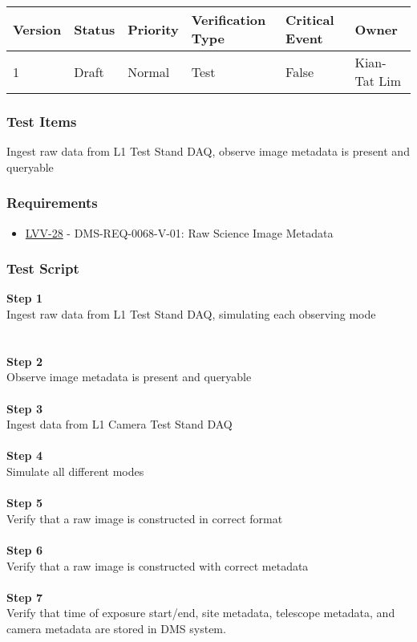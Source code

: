 \begin{longtable}[]{@{}llllll@{}}
\toprule
Version & Status & Priority & Verification Type & Critical Event &
Owner\tabularnewline
\midrule
\endhead
1 & Draft & Normal & Test & False & Kian-Tat Lim\tabularnewline
\bottomrule
\end{longtable}

\hypertarget{test-items-9}{%
\subsubsection{Test Items}\label{test-items-9}}

Ingest raw data from L1 Test Stand DAQ, observe image metadata is
present and queryable

\hypertarget{requirements-10}{%
\subsubsection{Requirements}\label{requirements-10}}

\begin{itemize}
\tightlist
\item
  \href{https://jira.lsstcorp.org/browse/LVV-28}{LVV-28} -
  DMS-REQ-0068-V-01: Raw Science Image Metadata
\end{itemize}

\hypertarget{test-script-10}{%
\subsubsection{Test Script}\label{test-script-10}}

\textbf{Step 1}\\
{Ingest raw data from L1 Test Stand DAQ, simulating each observing
mode\\
}~\\
~\\
\textbf{Step 2}\\
O{bserve image metadata is present and queryable}\\
~\\
\textbf{Step 3}\\
Ingest data from L1 Camera Test Stand DAQ\\
~\\
\textbf{Step 4}\\
Simulate all different modes\\
~\\
\textbf{Step 5}\\
Verify that a raw image is constructed in correct format\\
~\\
\textbf{Step 6}\\
Verify that a raw image is constructed with correct metadata\\
~\\
\textbf{Step 7}\\
Verify that time of exposure start/end, site metadata, telescope
metadata, and camera metadata are stored in DMS system.\\
~\\
~\\
~\\


